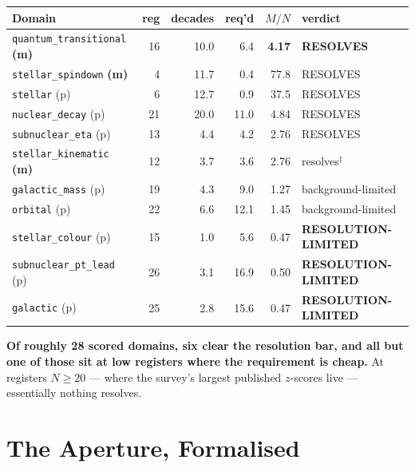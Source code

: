 \documentclass[11pt, letterpaper, openany]{book}
\newcommand{\MN}{M/N}
\begin{document}
\begin{table}[H]
\centering
\footnotesize
\begin{tabular}{@{}lrrrrl@{}}
\toprule
\textbf{Domain} & \textbf{reg} & \textbf{decades} & \textbf{req'd} & \textbf{$\MN$} & \textbf{verdict} \\
\midrule
\texttt{quantum\_transitional} \textbf{(m)} & 16 & 10.0 & 6.4 & \textbf{4.17} & \textbf{RESOLVES} \\
\texttt{stellar\_spindown} \textbf{(m)} & 4 & 11.7 & 0.4 & 77.8 & RESOLVES \\
\texttt{stellar} (p) & 6 & 12.7 & 0.9 & 37.5 & RESOLVES \\
\texttt{nuclear\_decay} (p) & 21 & 20.0 & 11.0 & 4.84 & RESOLVES \\
\texttt{subnuclear\_eta} (p) & 13 & 4.4 & 4.2 & 2.76 & RESOLVES \\
\texttt{stellar\_kinematic} \textbf{(m)} & 12 & 3.7 & 3.6 & 2.76 & resolves$^\ddagger$ \\
\midrule
\texttt{galactic\_mass} (p) & 19 & 4.3 & 9.0 & 1.27 & background-limited \\
\texttt{orbital} (p) & 22 & 6.6 & 12.1 & 1.45 & background-limited \\
\midrule
\texttt{stellar\_colour} (p) & 15 & 1.0 & 5.6 & 0.47 & \textbf{RESOLUTION-LIMITED} \\
\texttt{subnuclear\_pt\_lead} (p) & 26 & 3.1 & 16.9 & 0.50 & \textbf{RESOLUTION-LIMITED} \\
\texttt{galactic} (p) & 25 & 2.8 & 15.6 & 0.47 & \textbf{RESOLUTION-LIMITED} \\
\bottomrule
\end{tabular}
\end{table}

\begin{signalbox}
\textbf{Of roughly 28 scored domains, six clear the resolution bar, and all but one of those
sit at low registers where the requirement is cheap.} At registers $N \geq 20$ --- where the
survey's largest published $z$-scores live --- essentially nothing resolves.
\end{signalbox}

\chapter{The Aperture, Formalised}
\end{document}
